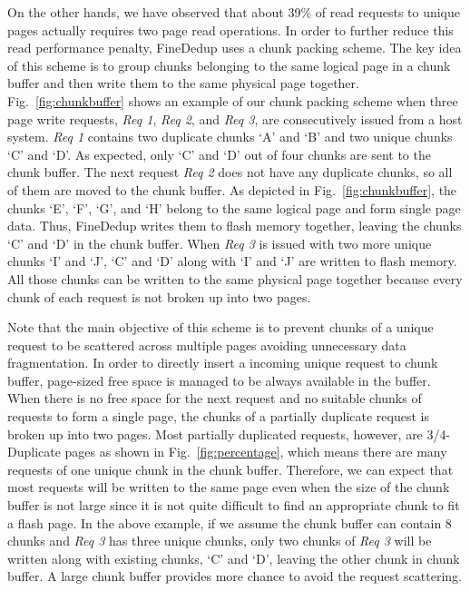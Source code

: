 On the other hands, we have observed that about 39\% of read requests to unique pages actually requires two page read operations.
In order to further reduce this read performance penalty,
FineDedup uses a chunk packing scheme.
The key idea of this scheme is to
group chunks belonging to the same logical page in a chunk buffer and 
then write them to the same physical page together.
Fig.~\ref{fig:chunkbuffer} shows an example of our chunk packing scheme
when three page write requests, \textit{Req 1}, \textit{Req 2}, and \textit{Req 3}, are consecutively issued from a host system.
\textit{Req 1} contains two duplicate chunks `A' and `B' and two unique chunks `C' and `D'.
As expected, only `C' and `D' out of four chunks are sent to the chunk buffer.
The next request \textit{Req 2} does not have any duplicate chunks,
so all of them are moved to the chunk buffer.
As depicted in Fig.~\ref{fig:chunkbuffer},
the chunks `E', `F', `G', and `H' belong to the same logical page and form single page data.
Thus, FineDedup writes them to flash memory together,
leaving the chunks `C' and `D' in the chunk buffer.
When \textit{Req 3} is issued with two more unique chunks `I' and `J', 
`C' and `D' along with `I' and `J' are written to flash memory.
All those chunks can be written to the same physical page together
because every chunk of each request is not broken up into two pages.

Note that the main objective of this scheme is to prevent chunks of a unique request to be scattered across multiple pages 
avoiding unnecessary data fragmentation.
In order to directly insert a incoming unique request to chunk buffer,
page-sized free space is managed to be always available in the buffer.
When there is no free space for the next request and no suitable chunks of requests to form a single page,
the chunks of a partially duplicate request is broken up into two pages.
Most partially duplicated requests, however, are 3/4-Duplicate pages as shown in Fig.~\ref{fig:percentage}, which means 
there are many requests of one unique chunk in the chunk buffer.
Therefore, we can expect that most requests will be written to the same page even when the size of the chunk buffer is not large 
since it is not quite difficult to find an appropriate chunk to fit a flash page.
In the above example, if we assume the chunk buffer can contain 8 chunks and \textit{Req 3} has three unique chunks,
only two chunks of \textit{Req 3} will be written along with existing chunks, `C' and `D', leaving the other chunk in chunk buffer.
A large chunk buffer provides more chance to avoid the request scattering.


